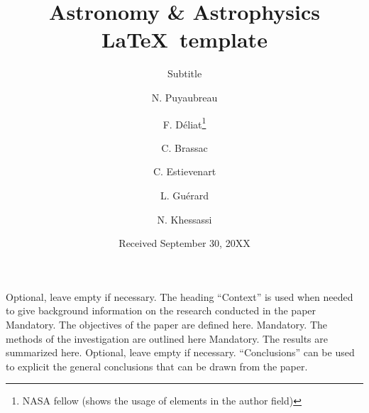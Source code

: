 \documentclass{aa}
\begin{document}
   \title{Astronomy \& Astrophysics \LaTeX\ template}

   \subtitle{Subtitle}

%
%
%

   \author{N. Puyaubreau        %
        \and F. Déliat\fnmsep\thanks{NASA fellow (shows the usage of elements in the author field)}
        \and C. Brassac
        \and C. Estievenart
        \and L. Guérard
        \and N. Khessassi
        }


   \date{Received September 30, 20XX}

 
  \abstract
   {Optional, leave empty if necessary.  The heading “Context” is used when needed to
give background information on the research conducted in the paper}
   {Mandatory. The objectives of the paper are defined here.} 
   {Mandatory. The methods of the investigation are outlined here}
   {Mandatory. The results are summarized here.}
   {Optional, leave empty if necessary.  “Conclusions” can be used to
explicit the general conclusions that can be drawn from the paper.}

\end{document}
